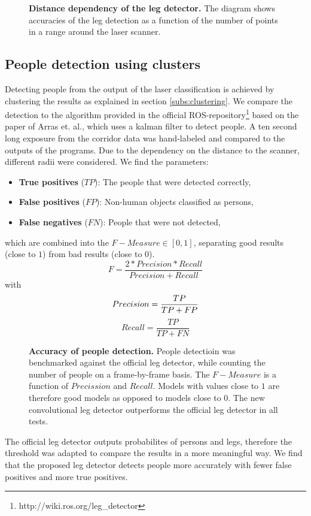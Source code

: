 \begin{figure}
	\label{fig:radius_detection}
		\normalsize
		\begin{center}
			
		\end{center}
		\caption{\textbf{Distance dependency of the leg detector.} The diagram shows accuracies of the leg detection as a function of the number of points in a range around the laser scanner.}
\end{figure}

\subsection{People detection using clusters}

Detecting people from the output of the laser classification is achieved by clustering the results as explained in section \ref{subs:clustering}. We compare the detection to the algorithm provided in the official ROS-repository\footnote{http://wiki.ros.org/leg\_detector} based on the paper of Arras et. al.\cite{Arras07usingboosted}, which uses a kalman filter to detect people. A ten second long exposure from the corridor data was hand-labeled and compared to the outputs of the programs. Due to the dependency on the distance to the scanner, different radii were considered. We find the parameters:
\begin{itemize}
	\item \textbf{True positives} ($TP$): The people that were detected correctly,
	\item \textbf{False positives} ($FP$): Non-human objects classified as persons,
	\item \textbf{False negatives} ($FN$): People that were not detected,
\end{itemize}
which are combined into the $F-Measure \in \left[ 0,1 \right]$, separating good results (close to $1$) from bad results (close to $0$).
\begin{equation}
	F=\frac{2*Precision*Recall}{Precision+Recall}
\end{equation}
with
\begin{equation}
	Precision = \frac{TP}{TP + FP}\\
\end{equation}
\begin{equation}
	Recall = \frac{TP}{TP + FN}
\end{equation}

\begin{figure}
	\label{fig:people_detection}
	\normalsize
	\begin{center}
		
	\end{center}
	\caption{\textbf{Accuracy of people detection.} People detectioin was benchmarked against the official leg detector, while counting the number of people on a frame-by-frame basis. The $F-Measure$ is a function of $Precission$ and $Recall$. Models with values close to $1$ are therefore good models as opposed to models close to $0$. The new convolutional leg detector outperforms the official leg detector in all tests.}
\end{figure}

The official leg detector outputs probabilites of persons and legs, therefore the threshold was adapted to compare the results in a more meaningful way. We find that the proposed leg detector detects people more accurately with fewer false positives and more true positives.


